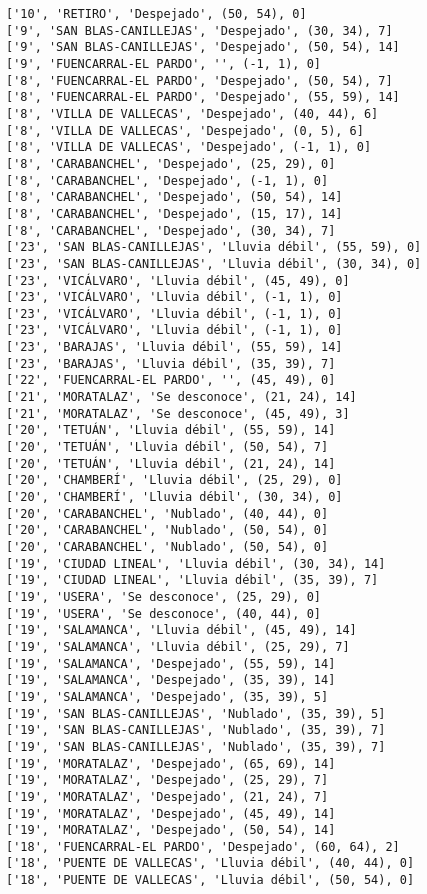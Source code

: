 \documentclass[11pt]{article}
\begin{document}
\begin{Verbatim}[commandchars=\\\{\}]
['10', 'RETIRO', 'Despejado', (50, 54), 0]
['9', 'SAN BLAS-CANILLEJAS', 'Despejado', (30, 34), 7]
['9', 'SAN BLAS-CANILLEJAS', 'Despejado', (50, 54), 14]
['9', 'FUENCARRAL-EL PARDO', '', (-1, 1), 0]
['8', 'FUENCARRAL-EL PARDO', 'Despejado', (50, 54), 7]
['8', 'FUENCARRAL-EL PARDO', 'Despejado', (55, 59), 14]
['8', 'VILLA DE VALLECAS', 'Despejado', (40, 44), 6]
['8', 'VILLA DE VALLECAS', 'Despejado', (0, 5), 6]
['8', 'VILLA DE VALLECAS', 'Despejado', (-1, 1), 0]
['8', 'CARABANCHEL', 'Despejado', (25, 29), 0]
['8', 'CARABANCHEL', 'Despejado', (-1, 1), 0]
['8', 'CARABANCHEL', 'Despejado', (50, 54), 14]
['8', 'CARABANCHEL', 'Despejado', (15, 17), 14]
['8', 'CARABANCHEL', 'Despejado', (30, 34), 7]
['23', 'SAN BLAS-CANILLEJAS', 'Lluvia débil', (55, 59), 0]
['23', 'SAN BLAS-CANILLEJAS', 'Lluvia débil', (30, 34), 0]
['23', 'VICÁLVARO', 'Lluvia débil', (45, 49), 0]
['23', 'VICÁLVARO', 'Lluvia débil', (-1, 1), 0]
['23', 'VICÁLVARO', 'Lluvia débil', (-1, 1), 0]
['23', 'VICÁLVARO', 'Lluvia débil', (-1, 1), 0]
['23', 'BARAJAS', 'Lluvia débil', (55, 59), 14]
['23', 'BARAJAS', 'Lluvia débil', (35, 39), 7]
['22', 'FUENCARRAL-EL PARDO', '', (45, 49), 0]
['21', 'MORATALAZ', 'Se desconoce', (21, 24), 14]
['21', 'MORATALAZ', 'Se desconoce', (45, 49), 3]
['20', 'TETUÁN', 'Lluvia débil', (55, 59), 14]
['20', 'TETUÁN', 'Lluvia débil', (50, 54), 7]
['20', 'TETUÁN', 'Lluvia débil', (21, 24), 14]
['20', 'CHAMBERÍ', 'Lluvia débil', (25, 29), 0]
['20', 'CHAMBERÍ', 'Lluvia débil', (30, 34), 0]
['20', 'CARABANCHEL', 'Nublado', (40, 44), 0]
['20', 'CARABANCHEL', 'Nublado', (50, 54), 0]
['20', 'CARABANCHEL', 'Nublado', (50, 54), 0]
['19', 'CIUDAD LINEAL', 'Lluvia débil', (30, 34), 14]
['19', 'CIUDAD LINEAL', 'Lluvia débil', (35, 39), 7]
['19', 'USERA', 'Se desconoce', (25, 29), 0]
['19', 'USERA', 'Se desconoce', (40, 44), 0]
['19', 'SALAMANCA', 'Lluvia débil', (45, 49), 14]
['19', 'SALAMANCA', 'Lluvia débil', (25, 29), 7]
['19', 'SALAMANCA', 'Despejado', (55, 59), 14]
['19', 'SALAMANCA', 'Despejado', (35, 39), 14]
['19', 'SALAMANCA', 'Despejado', (35, 39), 5]
['19', 'SAN BLAS-CANILLEJAS', 'Nublado', (35, 39), 5]
['19', 'SAN BLAS-CANILLEJAS', 'Nublado', (35, 39), 7]
['19', 'SAN BLAS-CANILLEJAS', 'Nublado', (35, 39), 7]
['19', 'MORATALAZ', 'Despejado', (65, 69), 14]
['19', 'MORATALAZ', 'Despejado', (25, 29), 7]
['19', 'MORATALAZ', 'Despejado', (21, 24), 7]
['19', 'MORATALAZ', 'Despejado', (45, 49), 14]
['19', 'MORATALAZ', 'Despejado', (50, 54), 14]
['18', 'FUENCARRAL-EL PARDO', 'Despejado', (60, 64), 2]
['18', 'PUENTE DE VALLECAS', 'Lluvia débil', (40, 44), 0]
['18', 'PUENTE DE VALLECAS', 'Lluvia débil', (50, 54), 0]

\end{Verbatim}
\end{document}
